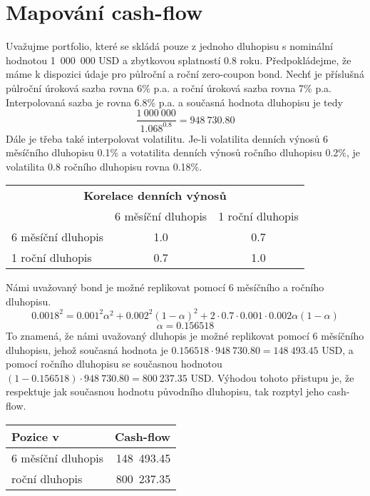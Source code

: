 \documentclass[a4paper]{book}
\begin{document}
\section{Mapování cash-flow}
Uvažujme portfolio, které se skládá pouze z jednoho dluhopisu s nominální hodnotou 1~000~000 USD a zbytkovou splatností 0.8 roku. Předpokládejme, že máme k dispozici údaje pro půlroční a roční zero-coupon bond. Nechť je příslušná půlroční úroková sazba rovna 6\% p.a. a roční úroková sazba rovna 7\% p.a. Interpolovaná sazba je rovna 6.8\% p.a. a současná hodnota dluhopisu je tedy
\begin{equation*}
\frac{1~000~000}{1.068^{0.8}}=948~730.80
\end{equation*}
Dále je třeba také interpolovat volatilitu. Je-li volatilita denních výnosů 6 měsíčního dluhopisu 0.1\% a votatilita denních výnosů  ročního dluhopisu 0.2\%, je volatilita 0.8 ročního dluhopisu rovna 0.18\%.
\begin{center}
\begin{tabular}{l c c}
\multicolumn{3}{c}{\textbf{Korelace denních výnosů}}\\
\textbf{} &
6 měsíční dluhopis & 
1 roční dluhopis \\
\hline
6 měsíční dluhopis & 1.0 &  0.7 \\
1 roční dluhopis   &  0.7 & 1.0 \\
\end{tabular}
\end{center}
Námi uvažovaný bond je možné replikovat pomocí 6 měsíčního a ročního dluhopisu.
\begin{equation*}
0.0018^2 = 0.001^2 \alpha^2 + 0.002^2(1-\alpha)^2 + 2 \cdot 0.7 \cdot 0.001 \cdot 0.002 \alpha (1-\alpha)
\end{equation*}
\begin{equation*}
\alpha = 0.156518
\end{equation*}
To znamená, že námi uvažovaný dluhopis je možné replikovat pomocí 6 měsíčního dluhopisu, jehož současná hodnota je $0.156518 \cdot 948~730.80 = 148~493.45$ USD, a pomocí ročního dluhopisu se současnou hodnotou $(1 - 0.156518) \cdot 948~730.80 = 800~237.35$ USD.
Výhodou tohoto přistupu je, že respektuje jak současnou hodnotu původního dluhopisu, tak rozptyl jeho cash-flow.
\begin{center}
\begin{tabular}{l r}
\textbf{Pozice v} &
\multicolumn {1}{c}{\textbf{Cash-flow}}\\
\hline
6 měsíční dluhopis &  148~493.45\\
roční dluhopis & 800~237.35\\
\hline 
\end{tabular}
\end{center}
\end{document}
